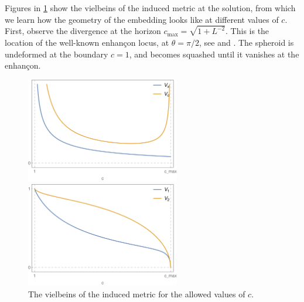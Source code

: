 Figures in \ref{fig:vielbeins} show the vielbeins of the induced metric at the solution, from which we learn how the geometry of the embedding looks like at different values of $c$. First, observe the divergence at the horizon $c_\text{max}=\sqrt{1+L^{-2}}$. This is the location of the well-known enhançon locus, at $\theta = \pi/2$, see \cite{Buchel:2000cn} and \cite{Evans:2000ct}. The spheroid is undeformed at the boundary $c=1$, and becomes squashed until it vanishes at the enhançon. 

\begin{figure}[t!]
\begin{center}
\includegraphics[width=0.6\textwidth]{pictures/vxvcb.png}
\end{center}
\vspace{0.05mm}
\begin{center}
\includegraphics[width=0.6\textwidth]{pictures/v1v2b.png}
\end{center}
\caption{\label{fig:vielbeins} The vielbeins of the induced metric for the allowed values of $c$.}
\end{figure}
